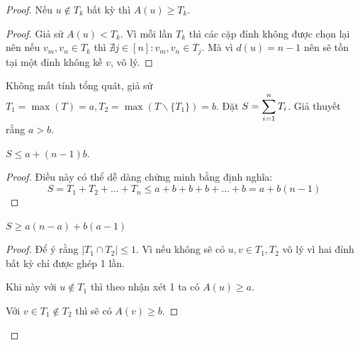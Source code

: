 \documentclass[11pt]{scrartcl}
\begin{document}
\begin{itemize}[label=, leftmargin=0em, itemsep=0.5em]
\begin{proof}
         Nếu $u \notin T_k$ bất kỳ thì $A(u) \geq T_k$.
        \begin{proof}
            Giả sử $A(u) < T_k$. Vì mỗi lần $T_k$ thì các cặp đỉnh không được chọn lại nên nếu $v_m,v_n \in T_k$ thì $\nexists j \in [n]: v_m,v_n \in T_j$. Mà vì $d(u) = n - 1$ nên sẽ tồn tại một đỉnh không kề $v$, vô lý.
        \end{proof}
        Không mất tính tổng quát, giả sử $T_1 = \max(T) = a, T_2 = \max(T \backslash \{T_1\}) = b$. Đặt $S = \displaystyle\sum_{i = 1}^n T_i$. Giả thuyết rằng $a > b$.

         $S \leq a +(n - 1)b$. 
        \begin{proof}
            Điều này có thể dễ dàng chứng minh bằng định nghĩa:
            \[
                S = T_1 + T_2 + \dots + T_n  \leq a + b + b + b +\dots + b = a + b(n - 1)
            \]
        \end{proof}
          $S \geq a(n - a) + b(a - 1)$
        \begin{proof}
            Để ý rằng $|T_1 \cap T_2| \leq 1$. Vì nếu không sẽ có $u,v \in T_1,T_2$ vô lý vì hai đỉnh bất kỳ chỉ được ghép 1 lần. 
            
            Khi này với $u  \notin T_1$ thì theo nhận xét 1 ta có $A(u) \geq a$. 
            
            Với $v \in T_1 \notin T_2$ thì sẽ có $A(v) \geq b$. 


\end{proof}
\end{proof}
\end{itemize}
\end{document}
